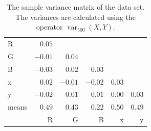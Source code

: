 \documentclass{article}
\DeclareMathOperator{\var}{var}
\begin{document}
\begin{table}[h] \centering 
\begin{tabular}{l|rrrrr} 
R     & $0.05$  &          &          &          &         \\ 
G     & $-0.01$ & $0.04$  &          &          &         \\ 
B     & $-0.03$ & $0.02$  & $0.03$  &          &         \\ 
x     & $0.02$  & $-0.01$ & $-0.02$ & $0.03$  &         \\ 
y     & $-0.02$ & $0.01$  & $0.01$  & $0.00$ & $0.03$ \\ 
\midrule
means & $0.49$   & $0.43$   & $0.22$   & $0.50$   & $0.49$  \\
\midrule
      & R        & G        & B        & x        & y       \\ 
\end{tabular} 
\caption{The sample variance matrix of the data set. The variances are calculated  using the operator $\var_{500}(X,Y).$}
\label{tab:var}
\end{table} 


\end{document}

